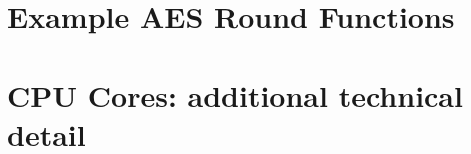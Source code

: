 \documentclass[preprint]{iacrtrans}
\begin{document}

\appendix

\clearpage
\section{Example AES Round Functions}
\label{sec:round-functions}

\clearpage
\section{CPU Cores: additional technical detail}
\label{sec:cores}


%

\end{document}
